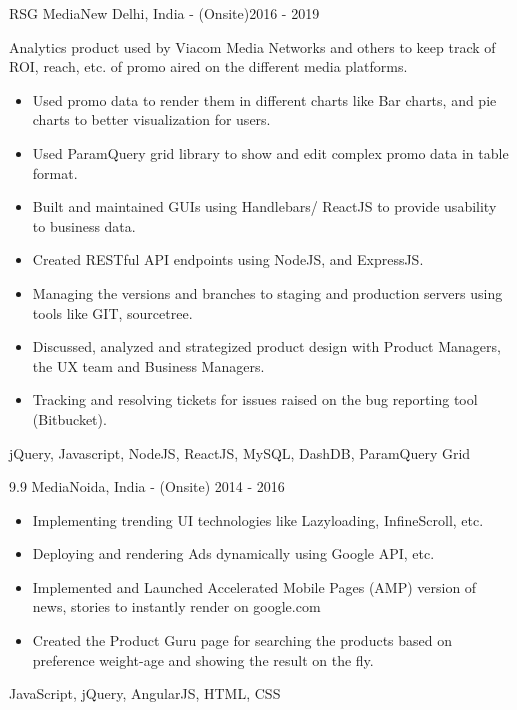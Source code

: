 \begin{projects}
    \newpage
    \project
    {RSG Media}{New Delhi, India - (Onsite)}{2016 - 2019}
    {}
    {Analytics product used by Viacom Media Networks and others to keep track of ROI, reach, etc. of promo aired on the different media platforms.
    \begin{itemize}
        \item Used promo data to render them in different charts like Bar charts, and pie charts to better visualization for users.
        \item Used ParamQuery grid library to show and edit complex promo data in table format.
        \item Built and maintained GUIs using Handlebars/ ReactJS to provide usability to business data.
        \item Created RESTful API endpoints using NodeJS, and ExpressJS.
        \item Managing the versions and branches to staging and production servers using tools like GIT, sourcetree.
        \item Discussed, analyzed and strategized product design with Product Managers, the UX team and Business Managers.
        \item Tracking and resolving tickets for issues raised on the bug reporting tool (Bitbucket).
    \end{itemize}}
    {jQuery, Javascript, NodeJS, ReactJS, MySQL, DashDB, ParamQuery Grid}

    \project
    {9.9 Media}{Noida, India - (Onsite)} {2014 - 2016}
    {}
    {\begin{itemize}
        \item Implementing trending UI technologies like Lazyloading, InfineScroll, etc.
        \item Deploying and rendering Ads dynamically using Google API, etc.
        \item Implemented and Launched Accelerated Mobile Pages (AMP) version of news, stories to instantly render on google.com
        \item Created the Product Guru page for searching the products based on preference weight-age and showing the result on the fly.
    \end{itemize}}
    {JavaScript, jQuery, AngularJS, HTML, CSS}
    

\end{projects}
